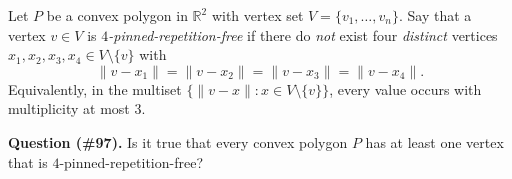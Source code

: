 Let $P$ be a convex polygon in $\mathbb{R}^2$ with vertex set $V=\{v_1,\dots,v_n\}$.
Say that a vertex $v\in V$ is \emph{$4$-pinned-repetition-free} if there do \emph{not} exist four \emph{distinct} vertices $x_1,x_2,x_3,x_4\in V\setminus\{v\}$ with
\[
\|v-x_1\|=\|v-x_2\|=\|v-x_3\|=\|v-x_4\|.
\]
Equivalently, in the multiset $\{\|v-x\|:x\in V\setminus\{v\}\}$, every value occurs with multiplicity at most $3$.

\medskip
\noindent\textbf{Question (\#97).} Is it true that every convex polygon $P$ has at least one vertex that is $4$-pinned-repetition-free?

\item
